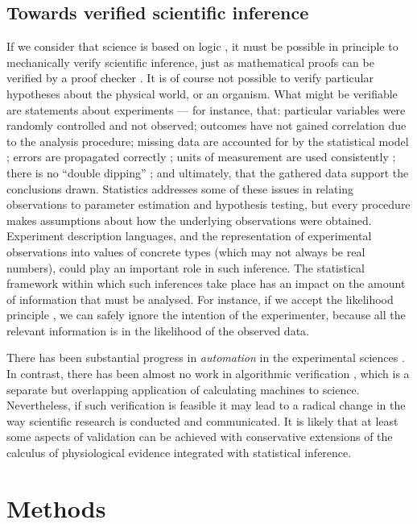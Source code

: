 \subsection*{Towards verified scientific inference}

If we consider that science is based on logic \citep{Jaynes2003}, it
must be possible in principle to mechanically verify scientific
inference, just as mathematical proofs can be verified by a proof
checker \citep{Harrison2009}. It is of course not possible to verify
particular hypotheses about the physical world, or an organism. What
might be verifiable are statements about experiments --- for instance,
that: particular variables were randomly controlled and not observed;
outcomes have not gained correlation due to the analysis procedure;
missing data are accounted for by the statistical model
\citep{Gelman2003}; errors are propagated correctly
\citep{Taylor1997}; units of measurement are used consistently
\citep{Kennedy1997}; there is no ``double dipping''
\citep{Kriegeskorte2009}; and ultimately, that the gathered data
support the conclusions drawn. Statistics addresses some of these
issues in relating observations to parameter estimation and hypothesis
testing, but every procedure makes assumptions about how the
underlying observations were obtained. Experiment description
languages, and the representation of experimental observations into
values of concrete types (which may not always be real numbers),
could play an important role in such inference. The statistical
framework within which such inferences take place has an impact on the
amount of information that must be analysed. For instance, if we
accept the likelihood principle \citep{Jaynes2003}, we can safely
ignore the intention of the experimenter, because all the relevant
information is in the likelihood of the observed data.

There has been substantial progress in \emph{automation} in the
experimental sciences \citep{King2004}. In contrast, there has been
almost no work in algorithmic verification \citep{Kropf1999,
  Sadot}, which is a separate but overlapping application of
calculating machines to science. Nevertheless, if such verification is
feasible it may lead to a radical change in the way scientific
research is conducted and communicated. It is likely that at least
some aspects of validation can be achieved with conservative
extensions of the calculus of physiological evidence integrated with
statistical inference.

\section*{Methods}

